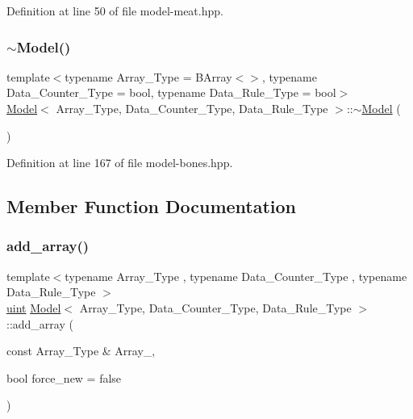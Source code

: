 Definition at line 50 of file model-\/meat.\+hpp.

\mbox{\label{class_model_a0eba131af14e1ceefc7748323e9fb4bf}} 
\subsubsection{\texorpdfstring{$\sim$\+Model()}{~Model()}}
{\footnotesize\ttfamily template$<$typename Array\+\_\+\+Type = B\+Array$<$$>$, typename Data\+\_\+\+Counter\+\_\+\+Type = bool, typename Data\+\_\+\+Rule\+\_\+\+Type = bool$>$ \\
\hyperlink{class_model}{Model}$<$ Array\+\_\+\+Type, Data\+\_\+\+Counter\+\_\+\+Type, Data\+\_\+\+Rule\+\_\+\+Type $>$\+::$\sim$\hyperlink{class_model}{Model} (\begin{DoxyParamCaption}{ }\end{DoxyParamCaption})\hspace{0.3cm}{\ttfamily [inline]}}



Definition at line 167 of file model-\/bones.\+hpp.



\subsection{Member Function Documentation}
\mbox{\label{class_model_a17a2205b52c03bb29eefb8fb126a01f6}} 
\subsubsection{\texorpdfstring{add\+\_\+array()}{add\_array()}}
{\footnotesize\ttfamily template$<$typename Array\+\_\+\+Type , typename Data\+\_\+\+Counter\+\_\+\+Type , typename Data\+\_\+\+Rule\+\_\+\+Type $>$ \\
\hyperlink{typedefs_8hpp_a91ad9478d81a7aaf2593e8d9c3d06a14}{uint} \hyperlink{class_model}{Model}$<$ Array\+\_\+\+Type, Data\+\_\+\+Counter\+\_\+\+Type, Data\+\_\+\+Rule\+\_\+\+Type $>$\+::add\+\_\+array (\begin{DoxyParamCaption}\item[{const Array\+\_\+\+Type \&}]{Array\+\_\+,  }\item[{bool}]{force\+\_\+new = {\ttfamily false} }\end{DoxyParamCaption})\hspace{0.3cm}{\ttfamily [inline]}}



